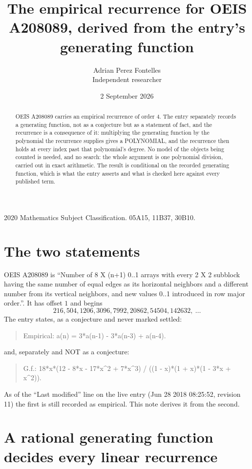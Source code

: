 \documentclass[11pt,a4paper]{article}
\title{The empirical recurrence for OEIS A208089, derived from the entry's generating function}
\author{Adrian Perez Fontelles\\ \small Independent researcher}
\date{2 September 2026}
\theoremstyle{plain}
\theoremstyle{definition}
\begin{document}
\maketitle

\begin{abstract}
OEIS A208089 carries an empirical recurrence of order $4$. The entry separately records a
generating function, not as a conjecture but as a statement of fact, and the recurrence is a
consequence of it: multiplying the generating function by the polynomial the recurrence
supplies gives a POLYNOMIAL, and the recurrence then holds at every index past that
polynomial's degree. No model of the objects being counted is needed, and no search: the
whole argument is one polynomial division, carried out in exact arithmetic. The result is
conditional on the recorded generating function, which is what the entry asserts and what is
checked here against every published term.
\end{abstract}

\noindent\small 2020 Mathematics Subject Classification. 05A15, 11B37, 30B10.\normalsize

\section{The two statements}

OEIS A208089 is ``Number of 8 X (n+1) 0..1 arrays with every 2 X 2 subblock having the same number of equal edges as its horizontal neighbors and a different number from its vertical neighbors, and new values 0..1 introduced in row major order.''. It has offset $1$ and begins
\[
216, 504, 1206, 3096, 7992, 20862, 54504, 142632,\ \dots
\]
The entry states, as a conjecture and never marked settled:
\begin{quote}
Empirical: a(n) = 3*a(n-1) - 3*a(n-3) + a(n-4).
\end{quote}
and, separately and NOT as a conjecture:
\begin{quote}
G.f.: 18*x*(12 - 8*x - 17*x\^{}2 + 7*x\^{}3) / ((1 - x)*(1 + x)*(1 - 3*x + x\^{}2)).
\end{quote}
As of the ``Last modified'' line on the live entry (Jun 28 2018 08:25:52, revision 11) the first is still
recorded as empirical. This note derives it from the second.

\section{A rational generating function decides every linear recurrence}
\end{document}
